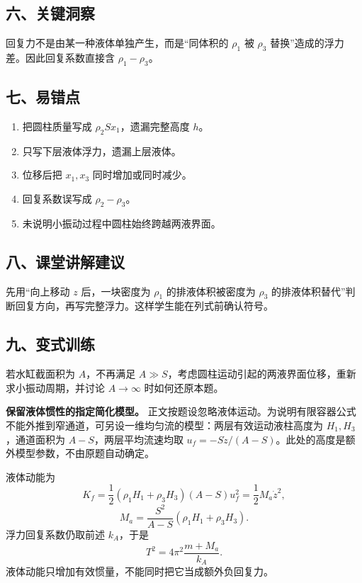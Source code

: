 \documentclass[12pt,a4paper,UTF8]{ctexart}
\newcommand{\tightlist}{\setlength{\itemsep}{0pt}\setlength{\parskip}{0pt}}
\begin{document}
\subsection{六、关键洞察}\label{ux516dux5173ux952eux6d1eux5bdf}

回复力不是由某一种液体单独产生，而是``同体积的 \(\rho_1\) 被 \(\rho_3\)
替换''造成的浮力差。因此回复系数直接含 \(\rho_1-\rho_3\)。

\subsection{七、易错点}\label{ux4e03ux6613ux9519ux70b9}

\begin{enumerate}
\def\labelenumi{\arabic{enumi}.}
\tightlist
\item
  把圆柱质量写成 \(\rho_2Sx_1\)，遗漏完整高度 \(h\)。
\item
  只写下层液体浮力，遗漏上层液体。
\item
  位移后把 \(x_1,x_3\) 同时增加或同时减少。
\item
  回复系数误写成 \(\rho_2-\rho_3\)。
\item
  未说明小振动过程中圆柱始终跨越两液界面。
\end{enumerate}

\subsection{八、课堂讲解建议}\label{ux516bux8bfeux5802ux8bb2ux89e3ux5efaux8bae}

先用``向上移动 \(z\) 后，一块密度为 \(\rho_1\) 的排液体积被密度为
\(\rho_3\)
的排液体积替代''判断回复方向，再写完整浮力。这样学生能在列式前确认符号。

\subsection{九、变式训练}\label{ux4e5dux53d8ux5f0fux8badux7ec3}

若水缸截面积为 \(A\)，不再满足
\(A\gg S\)，考虑圆柱运动引起的两液界面位移，重新求小振动周期，并讨论
\(A\to\infty\) 时如何还原本题。

\textbf{保留液体惯性的指定简化模型。}
正文按题设忽略液体运动。为说明有限容器公式不能外推到窄通道，可另设一维均匀流的模型：两层有效运动液柱高度为
\(H_1,H_3\)，通道面积为 \(A-S\)，两层平均流速均取
\(u_f=-S\dot z/(A-S)\)。此处的高度是额外模型参数，不由原题自动确定。

液体动能为 \[
K_f=\frac12(\rho_1H_1+\rho_3H_3)(A-S)u_f^2
=\frac12M_a\dot z^2,
\] \[
M_a=\frac{S^2}{A-S}(\rho_1H_1+\rho_3H_3).
\] 浮力回复系数仍取前述 \(k_A\)，于是 \[
T^2=4\pi^2\frac{m+M_a}{k_A}.
\] 液体动能只增加有效惯量，不能同时把它当成额外负回复力。
\end{document}
